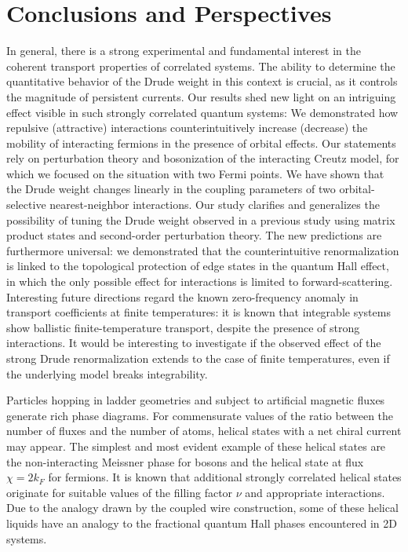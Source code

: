 %
\chapter*{Conclusions and Perspectives}
%
In general, there is a strong experimental and fundamental interest in the coherent transport properties of correlated systems.
The ability to determine the quantitative behavior of the Drude weight in this context is crucial, as it controls the magnitude of persistent currents.
Our results shed new light on an intriguing effect visible in such strongly correlated quantum systems: We demonstrated how repulsive (attractive) interactions counterintuitively increase (decrease) the mobility of interacting fermions in the presence of orbital effects.
Our statements rely on perturbation theory and bosonization of the interacting Creutz model, for which we focused on the situation with two Fermi points.
We have shown that the Drude weight changes linearly in the coupling parameters of two orbital-selective nearest-neighbor interactions.
Our study clarifies and generalizes the possibility of tuning the Drude weight observed in a previous study using matrix product states and second-order perturbation theory.
The new predictions are furthermore universal: we demonstrated that the counterintuitive renormalization is linked to the topological protection of edge states in the quantum Hall effect, in which the only possible effect for interactions is limited to forward-scattering.
Interesting future directions regard the known zero-frequency anomaly in transport coefficients at finite temperatures: it is known that integrable systems show ballistic finite-temperature transport, despite the presence of strong interactions.
It would be interesting to investigate if the observed effect of the strong Drude renormalization extends to the case of finite temperatures, even if the underlying model breaks integrability.

Particles hopping in ladder geometries and subject to artificial magnetic fluxes generate rich phase diagrams.
For commensurate values of the ratio between the number of fluxes and the number of atoms, helical states with a net chiral current may appear.
The simplest and most evident example of these helical states are the non-interacting Meissner phase for bosons and the helical state at flux $\chi = 2k_F$ for fermions.
It is known that additional strongly correlated helical states originate for suitable values of the filling factor $\nu$ and appropriate interactions.
Due to the analogy drawn by the coupled wire construction, some of these helical liquids have an analogy to the fractional quantum Hall phases encountered in 2D systems.

